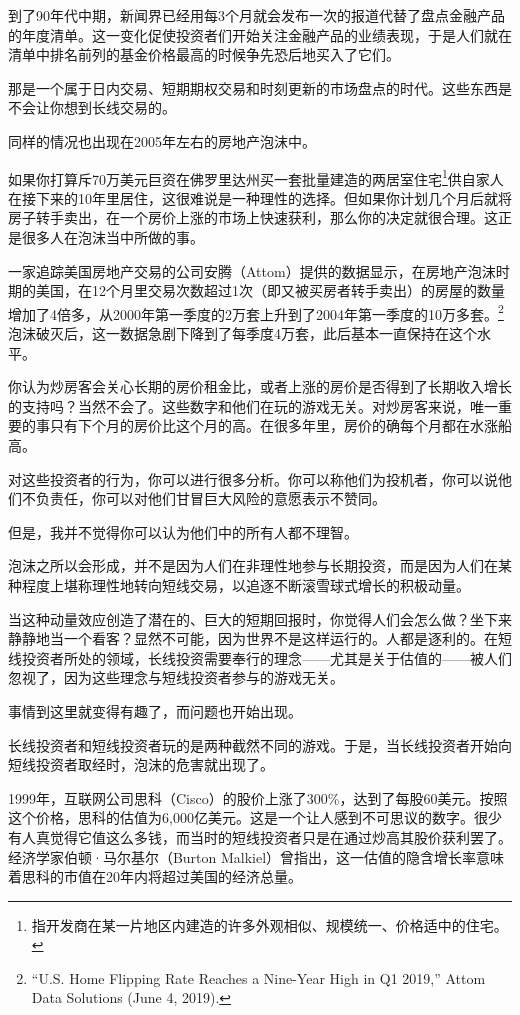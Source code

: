 {\kaishu

到了90年代中期，新闻界已经用每3个月就会发布一次的报道代替了盘点金融产品的年度清单。这一变化促使投资者们开始关注金融产品的业绩表现，于是人们就在清单中排名前列的基金价格最高的时候争先恐后地买入了它们。

}

那是一个属于日内交易、短期期权交易和时刻更新的市场盘点的时代。这些东西是不会让你想到长线交易的。

同样的情况也出现在2005年左右的房地产泡沫中。

如果你打算斥70万美元巨资在佛罗里达州买一套批量建造的两居室住宅\footnote{指开发商在某一片地区内建造的许多外观相似、规模统一、价格适中的住宅。}供自家人在接下来的10年里居住，这很难说是一种理性的选择。但如果你计划几个月后就将房子转手卖出，在一个房价上涨的市场上快速获利，那么你的决定就很合理。这正是很多人在泡沫当中所做的事。

一家追踪美国房地产交易的公司安腾（Attom）提供的数据显示，在房地产泡沫时期的美国，在12个月里交易次数超过1次（即又被买房者转手卖出）的房屋的数量增加了4倍多，从2000年第一季度的2万套上升到了2004年第一季度的10万多套。\footnote{“U.S. Home Flipping Rate Reaches a Nine-Year High in Q1 2019,” Attom Data Solutions (June 4, 2019).}泡沫破灭后，这一数据急剧下降到了每季度4万套，此后基本一直保持在这个水平。

你认为炒房客会关心长期的房价租金比，或者上涨的房价是否得到了长期收入增长的支持吗？当然不会了。这些数字和他们在玩的游戏无关。对炒房客来说，唯一重要的事只有下个月的房价比这个月的高。在很多年里，房价的确每个月都在水涨船高。

对这些投资者的行为，你可以进行很多分析。你可以称他们为投机者，你可以说他们不负责任，你可以对他们甘冒巨大风险的意愿表示不赞同。

但是，我并不觉得你可以认为他们中的所有人都不理智。

泡沫之所以会形成，并不是因为人们在非理性地参与长期投资，而是因为人们在某种程度上堪称理性地转向短线交易，以追逐不断滚雪球式增长的积极动量。

当这种动量效应创造了潜在的、巨大的短期回报时，你觉得人们会怎么做？坐下来静静地当一个看客？显然不可能，因为世界不是这样运行的。人都是逐利的。在短线投资者所处的领域，长线投资需要奉行的理念——尤其是关于估值的——被人们忽视了，因为这些理念与短线投资者参与的游戏无关。

事情到这里就变得有趣了，而问题也开始出现。

长线投资者和短线投资者玩的是两种截然不同的游戏。于是，当长线投资者开始向短线投资者取经时，泡沫的危害就出现了。

1999年，互联网公司思科（Cisco）的股价上涨了300\%，达到了每股60美元。按照这个价格，思科的估值为6,000亿美元。这是一个让人感到不可思议的数字。很少有人真觉得它值这么多钱，而当时的短线投资者只是在通过炒高其股价获利罢了。经济学家伯顿·马尔基尔（Burton Malkiel）曾指出，这一估值的隐含增长率意味着思科的市值在20年内将超过美国的经济总量。


